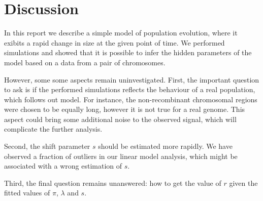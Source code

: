 \documentclass[a4paper]{article}
\begin{document}
\section{Discussion}

In this report we describe a simple model of population evolution, where it exibits
a rapid change in size at the given point of time. We performed simulations and showed
that it is possible to infer the hidden parameters of the model based on a data
from a pair of chromosomes.

However, some some aspects remain uninvestigated. First, the important question to ask
is if the performed simulations reflects the behaviour of a real population, which
follows out model. For instance, the non-recombinant chromosomal regions were chosen
to be equally long, however it is not true for a real genome. This aspect could bring
some additional noise to the observed signal, which will complicate the further analysis.

Second, the shift parameter $s$ should be estimated more rapidly. We have observed a fraction
of outliers in our linear model analysis, which might be associated with a wrong estimation of $s$.

Third, the final question remains unanswered: how to get the value of $r$ given the fitted values of
$\pi$, $\lambda$ and $s$.
\end{document}
